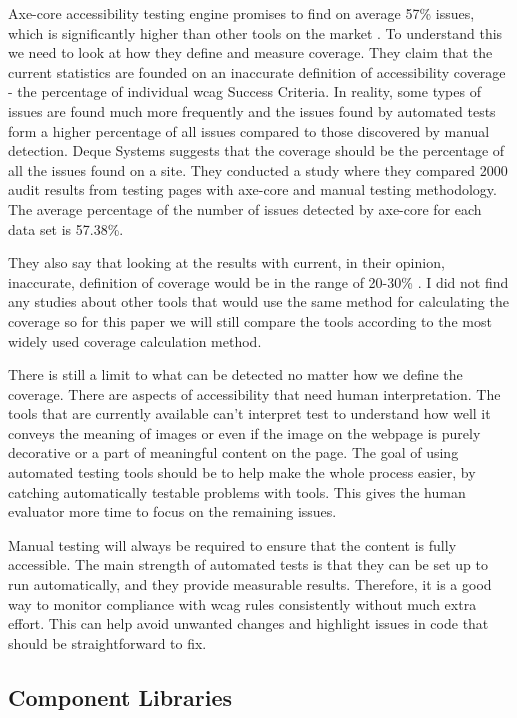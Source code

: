 \documentclass{master_thesis}
\begin{document}
Axe-core accessibility testing engine promises to find on average 57\% issues, which is significantly higher than other tools on the market \citep{Deque2023}. To understand this we need to look at how they define and measure coverage. They claim that the current statistics are founded on an inaccurate definition of accessibility coverage - the percentage of individual \ac{wcag} Success Criteria. In reality, some types of issues are found much more frequently and the issues found by automated tests form a higher percentage of all issues compared to those discovered by manual detection. Deque Systems suggests that the coverage should be the percentage of all the issues found on a site. They conducted a study where they compared 2000 audit results from testing pages with axe-core and manual testing methodology. The average percentage of the number of issues detected by axe-core for each data set is 57.38\%.

They also say that looking at the results with current, in their opinion, inaccurate, definition of coverage would be in the range of 20-30\% \citep{DequeSystems2021report}. I did not find any studies about other tools that would use the same method for calculating the coverage so for this paper we will still compare the tools according to the most widely used coverage calculation method.

There is still a limit to what can be detected no matter how we define the coverage. There are aspects of accessibility that need human interpretation. The tools that are currently available can't interpret test to understand how well it conveys the meaning of images or even if the image on the webpage is purely decorative or a part of meaningful content on the page. The goal of using automated testing tools should be to help make the whole process easier, by catching automatically testable problems with tools. This gives the human evaluator more time to focus on the remaining issues.

Manual testing will always be required to ensure that the content is fully accessible. The main strength of automated tests is that they can be set up to run automatically, and they provide measurable results. Therefore, it is a good way to monitor compliance with \ac{wcag} rules consistently without much extra effort. This can help avoid unwanted changes and highlight issues in code that should be straightforward to fix.

\subsection{Component Libraries}
\end{document}
